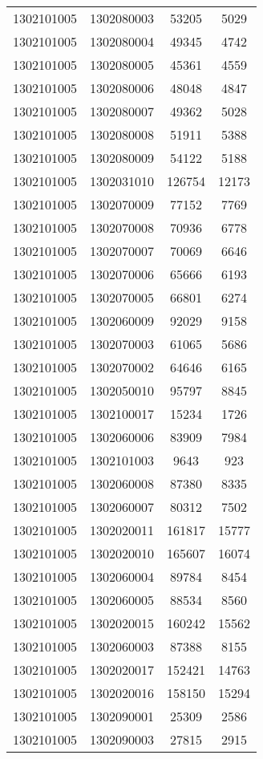 \begin{longtable}{llcc}
1302101005 & 1302080003 & 53205 & 5029\\
1302101005 & 1302080004 & 49345 & 4742\\
1302101005 & 1302080005 & 45361 & 4559\\
1302101005 & 1302080006 & 48048 & 4847\\
1302101005 & 1302080007 & 49362 & 5028\\
1302101005 & 1302080008 & 51911 & 5388\\
1302101005 & 1302080009 & 54122 & 5188\\
1302101005 & 1302031010 & 126754 & 12173\\
1302101005 & 1302070009 & 77152 & 7769\\
1302101005 & 1302070008 & 70936 & 6778\\
1302101005 & 1302070007 & 70069 & 6646\\
1302101005 & 1302070006 & 65666 & 6193\\
1302101005 & 1302070005 & 66801 & 6274\\
1302101005 & 1302060009 & 92029 & 9158\\
1302101005 & 1302070003 & 61065 & 5686\\
1302101005 & 1302070002 & 64646 & 6165\\
1302101005 & 1302050010 & 95797 & 8845\\
1302101005 & 1302100017 & 15234 & 1726\\
1302101005 & 1302060006 & 83909 & 7984\\
1302101005 & 1302101003 & 9643 & 923\\
1302101005 & 1302060008 & 87380 & 8335\\
1302101005 & 1302060007 & 80312 & 7502\\
1302101005 & 1302020011 & 161817 & 15777\\
1302101005 & 1302020010 & 165607 & 16074\\
1302101005 & 1302060004 & 89784 & 8454\\
1302101005 & 1302060005 & 88534 & 8560\\
1302101005 & 1302020015 & 160242 & 15562\\
1302101005 & 1302060003 & 87388 & 8155\\
1302101005 & 1302020017 & 152421 & 14763\\
1302101005 & 1302020016 & 158150 & 15294\\
1302101005 & 1302090001 & 25309 & 2586\\
1302101005 & 1302090003 & 27815 & 2915\\

\end{longtable}
